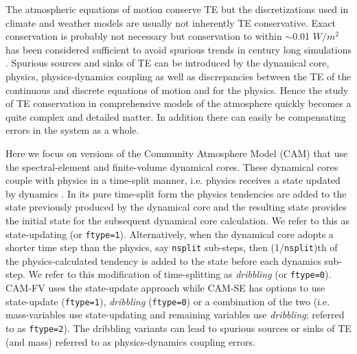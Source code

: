 \documentclass{agujournal}
\begin{document}
The atmospheric equations of motion conserve TE but the discretizations used in climate and weather models are usually not inherently TE conservative. Exact conservation is probably not necessary but conservation to within $\sim $0.01  $W/m^2$ has been considered sufficient to avoid spurious trends in century long simulations \citep{B2000S,WOHTTV2015JAMES}. Spurious sources and sinks of TE can be introduced by the dynamical core, physics, physics-dynamics coupling as well as discrepancies between the TE of the continuous and discrete equations of motion and for the physics. Hence the study of TE conservation in comprehensive models of the atmosphere quickly becomes a quite complex and detailed matter. In addition there can easily be compensating errors in the system as a whole.

Here we focus on versions of the Community Atmosphere Model (CAM) that use the spectral-element \citep[SE, ][]{LetAl2018JAMES} and finite-volume \citep[FV, ][]{L2004MWR} dynamical cores. These dynamical cores couple with physics in a time-split manner, i.e. physics receives a state updated by dynamics \citep[see ][ for a discussion of time-split versus process split physics-dynamics coupling in the context of CAM]{W2002MWR}. In its pure time-split form the physics tendencies are added to the state previously produced by the dynamical core and the resulting state provides the initial state for the subsequent dynamical core calculation. We refer to this as state-updating (or {\tt{ftype=1}}). Alternatively, when the dynamical core adopts a shorter time step than the physics, say {\tt{nsplit}} sub-steps, then (1/{\tt{nsplit}})th of the physics-calculated tendency is added to the state before each dynamics sub-step. We refer to this modification of time-splitting as {\em{dribbling}} (or {\tt{ftype=0}}). CAM-FV uses the state-update approach while CAM-SE has options to use state-update ({\tt{ftype=1}}), {\em{dribbling}} ({\tt{ftype=0}}) or a combination of the two (i.e. mass-variables use state-updating and remaining variables use {\em{dribbling}}; referred to as {\tt{ftype=2}}). The dribbling variants can lead to spurious sources or sinks of TE (and mass) referred to as physics-dynamics coupling errors.
\end{document}
